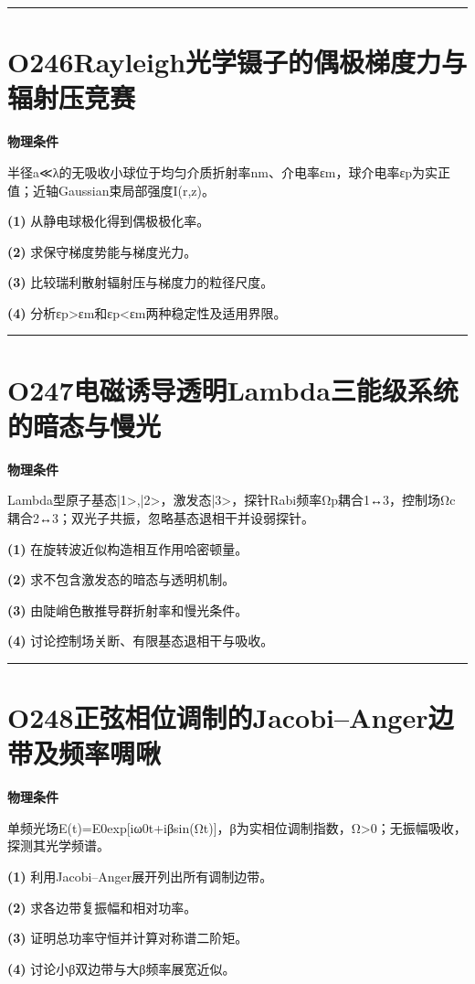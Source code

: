 \documentclass[UTF8,a4paper,11pt,oneside,openany]{ctexbook}
\begin{document}
\par\bigskip\hrule\bigskip
\section*{O246\quad Rayleigh光学镊子的偶极梯度力与辐射压竞赛}
\textbf{物理条件}\par 半径a≪λ的无吸收小球位于均匀介质折射率nm、介电率εm，球介电率εp为实正值；近轴Gaussian束局部强度I(r,z)。
\par\noindent\textbf{(1)} 从静电球极化得到偶极极化率。
\par\noindent\textbf{(2)} 求保守梯度势能与梯度光力。
\par\noindent\textbf{(3)} 比较瑞利散射辐射压与梯度力的粒径尺度。
\par\noindent\textbf{(4)} 分析εp>εm和εp<εm两种稳定性及适用界限。

\par\bigskip\hrule\bigskip
\section*{O247\quad 电磁诱导透明Lambda三能级系统的暗态与慢光}
\textbf{物理条件}\par Lambda型原子基态|1>,|2>，激发态|3>，探针Rabi频率Ωp耦合1↔3，控制场Ωc耦合2↔3；双光子共振，忽略基态退相干并设弱探针。
\par\noindent\textbf{(1)} 在旋转波近似构造相互作用哈密顿量。
\par\noindent\textbf{(2)} 求不包含激发态的暗态与透明机制。
\par\noindent\textbf{(3)} 由陡峭色散推导群折射率和慢光条件。
\par\noindent\textbf{(4)} 讨论控制场关断、有限基态退相干与吸收。

\par\bigskip\hrule\bigskip
\section*{O248\quad 正弦相位调制的Jacobi–Anger边带及频率啁啾}
\textbf{物理条件}\par 单频光场E(t)=E0exp[iω0t+iβsin(Ωt)]，β为实相位调制指数，Ω>0；无振幅吸收，探测其光学频谱。
\par\noindent\textbf{(1)} 利用Jacobi–Anger展开列出所有调制边带。
\par\noindent\textbf{(2)} 求各边带复振幅和相对功率。
\par\noindent\textbf{(3)} 证明总功率守恒并计算对称谱二阶矩。
\par\noindent\textbf{(4)} 讨论小β双边带与大β频率展宽近似。
\end{document}
